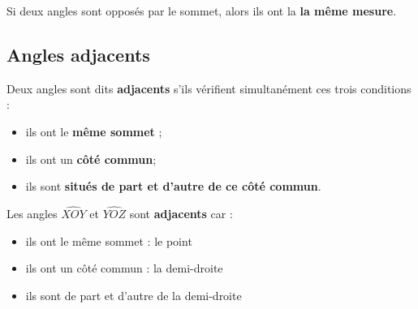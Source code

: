 \documentclass[a4paper]{book}
\begin{document}
    
    \begin{propriete}
        Si deux angles sont opposés par le sommet, alors ils ont la \textbf{la même mesure}.
    \end{propriete}
    
        
\subsection{Angles adjacents}
    
    \begin{definition}
        Deux angles sont dits \textbf{adjacents} s'ils vérifient simultanément ces trois conditions :
        \begin{itemize}
            \item ils ont le \textbf{même sommet} ;
            \item ils ont un \textbf{côté commun};
            \item ils sont \textbf{situés de part et d'autre de ce côté commun}.
        \end{itemize}
    \end{definition}
    
    \begin{exemple}
        \begin{minipage}{0.6\linewidth}
            Les angles $\widehat{XOY}$ et $\widehat{YOZ}$ sont \textbf{adjacents} car :
            \begin{itemize}
                \item ils ont le même sommet : le point \points[6]
                \item ils ont un côté commun : la demi-droite \points[6]
                \item ils sont de part et d'autre de la demi-droite \points[6]
            \end{itemize}
        \end{minipage}
        \hfill
        \begin{minipage}{0.38\linewidth}
            \begin{center}
            \end{center}
        \end{minipage}  
    \end{exemple}
\end{document}
